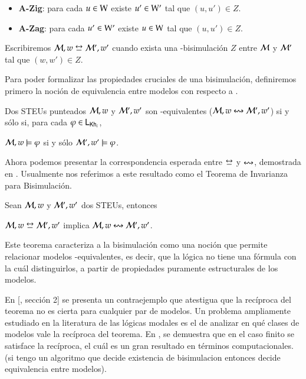 \begin{definicion}
\begin{itemize}
        \item \textbf{A-Zig}: para cada $u \in \mathrm{W}$ existe $u' \in \mathrm{W}'$ tal que $(u,u') \in Z$.

        \item \textbf{A-Zag}: para cada $u' \in \mathrm{W}'$ existe $u \in \mathrm{W}$ tal que $(u,u') \in Z$.
    \end{itemize} 

    Escribiremos $\modults,w \bisim \modults',w'$ cuando exista una \KHilogic-bisimulación $Z$ entre
    $\mathcal{M}$ y $\mathcal{M}'$ tal que $(w,w') \in Z$.

\end{definicion}

Para poder formalizar las propiedades cruciales de una bisimulación, definiremos primero la noción de 
equivalencia entre modelos con respecto a \KHilogic.

\begin{definicion}
    Dos STEUs punteados $\mathcal{M},w$ y $\mathcal{M}',w'$ son \KHilogic-equivalentes ($\mathcal{M}, w \mathrel{\leftrightsquigarrow} \mathcal{M}', w'$)
    si y sólo si, para cada $\varphi \in \mathsf{L}_{\mathsf{Kh}_i}$,
    \begin{center}
        $\mathcal{M}, w \models \varphi$ \quad si y sólo \quad $\mathcal{M}', w' \models \varphi$.
    \end{center} 
\end{definicion}

Ahora podemos presentar la correspondencia esperada entre $\bisim$ y $\mathrel{\leftrightsquigarrow}$, demostrada en \cite{ArecesFSV25}.
Usualmente nos referimos a este resultado como el Teorema de Invarianza para Bisimulación.

\begin{teorema}
    Sean $\mathcal{M},w$ y $\mathcal{M}',w'$ dos STEUs, entonces
    \begin{center}
        $\modults,w \bisim \modults',w'$ implica $\mathcal{M},w \mathrel{\leftrightsquigarrow} \mathcal{M}',w'$.
    \end{center}
\end{teorema}

Este teorema caracteriza a la bisimulación como una noción que permite relacionar modelos \KHilogic-equivalentes, es decir, que la lógica no tiene una fórmula con la cuál distinguirlos,
a partir de propiedades puramente estructurales de los modelos.

En [\cite{FervariVQW21}, sección 2] se presenta un contraejemplo que atestigua que la recíproca del teorema no es cierta para cualquier par de modelos.
Un problema ampliamente estudiado en la literatura de las lógicas modales es el de analizar en qué clases de modelos vale la recíproca del teorema.
En \cite{ArecesFSV25}, se demuestra que en el caso finito se satisface la recíproca, el cuál es un gran resultado en términos computacionales. (si tengo un algoritmo que decide existencia de bisimulacion entonces decide equivalencia entre modelos).

